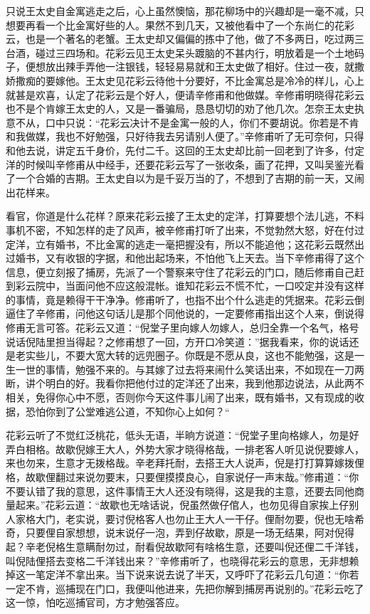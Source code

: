 \documentclass[12pt,UTF8]{ctexbook}
\begin{document}
{{{只说王太史自金寓逃走之后，心上虽然懊恼，那花柳场中的兴趣却是一毫不减，只想要再看一个比金寓好些的人。果然不到几天，又被他看中了一个东尚仁的花彩云，也是一个著名的老蟹。王太史却又偏偏的拣中了他，做了不多两日，吃过两三台酒，碰过三四场和。花彩云见王太史呆头踱脑的不甚内行，明放着是一个土地码子，便想放出辣手弄他一注银钱，轻轻易易就和王太史做了相好。住过一夜，就撒娇撒痴的要嫁他。王太史见花彩云待他十分要好，不比金寓总是冷冷的样儿，心上就甚是欢喜，认定了花彩云是个好人，便请辛修甫和他做媒。辛修甫明晓得花彩云也不是个肯嫁王太史的人，又是一番骗局，恳恳切切的劝了他几次。怎奈王太史执意不从，口中只说：“花彩云决计不是金寓一般的人，你们不要胡说。你若是不肯和我做媒，我也不好勉强，只好待我去另请别人便了。”辛修甫听了无可奈何，只得和他去说，讲定五千身价，先付二千。这回的王太史却比前一回老到了许多，付定洋的时候叫辛修甫从中经手，还要花彩云写了一张收条，画了花押，又叫吴鉴光看了一个合婚的吉期。王太史自以为是千妥万当的了，不想到了吉期的前一天，又闹出花样来。

看官，你道是什么花样？原来花彩云接了王太史的定洋，打算要想个法儿逃，不料事机不密，不知怎样的走了风声，被辛修甫打听了出来，不觉勃然大怒，好在付过定洋，立有婚书，不比金寓的逃走一毫把握没有，所以不能追他；这花彩云既然出过婚书，又有收银的字据，和他出起场来，不怕他飞上天去。当下辛修甫得了这个信息，便立刻报了捕房，先派了一个警察来守住了花彩云的门口，随后修甫自己赶到彩云院中，当面问他不应这般混帐。谁知花彩云不慌不忙，一口咬定并没有这样的事情，竟是赖得干干净净。修甫听了，也指不出个什么逃走的凭据来。花彩云倒逼住了辛修甫，问他这句话儿是那个同他说的，一定要修甫指出这个人来，倒说得修甫无言可答。花彩云又道：“倪堂子里向嫁人勿嫁人，总归全靠一个名气，格号说话倪陆里担当得起？之修甫想了一回，方开口冷笑道：”据我看来，你的说话还是老实些儿，不要大宽大转的远兜圈子。你既是不愿从良，这也不能勉强，这是一生一世的事情，勉强不来的。与其嫁了过去将来闹什么笑话出来，不如现在一刀两断，讲个明白的好。我看你把他付过的定洋还了出来，我到他那边说法，从此两不相关，免得你心中不愿，否则你今天这件事儿闹了出来，既有婚书，又有现成的收据，恐怕你到了公堂难逃公道，不知你心上如何？“

花彩云听了不觉红泛桃花，低头无语，半晌方说道：“倪堂子里向格嫁人，勿是好弄白相格。故歇倪嫁王大人，外势大家才晓得格哉，一排老客人听见说倪要嫁人，来也勿来，生意才无拨格哉。辛老拜托耐，去搭王大人说声，倪是打打算算嫁拨俚格，故歇俚翻过来说勿要末，只要俚摸摸良心，自家说仔一声末哉。”修甫道：“你不要认错了我的意思，这件事情王大人还没有晓得，这是我的主意，还要去同他商量起来。”花彩云道：“故歇也无啥话说，倪虽然做仔倌人，也勿见得自家挨上仔别人家格大门，老实说，要讨倪格客人也勿止王大人一干仔。俚耐勿要，倪也无啥希奇，只要俚自家想想，说末说仔一泡，弄到仔故歇，原是一场无结果，阿对倪得起？辛老倪格生意瞒耐勿过，耐看倪故歇阿有啥格生意，还要叫倪还俚二千洋钱，叫倪陆俚搭去变格二千洋钱出来？”辛修甫听了，也晓得花彩云的意思，无非想赖掉这一笔定洋不拿出来。当下说来说去说了半天，又呼吓了花彩云几句道：“你若一定不肯，巡捕现在门口，我便叫他进来，先把你解到捕房再说别的。”花彩云吃了这一惊，怕吃巡捕官司，方才勉强答应。

}}}
\end{document}
